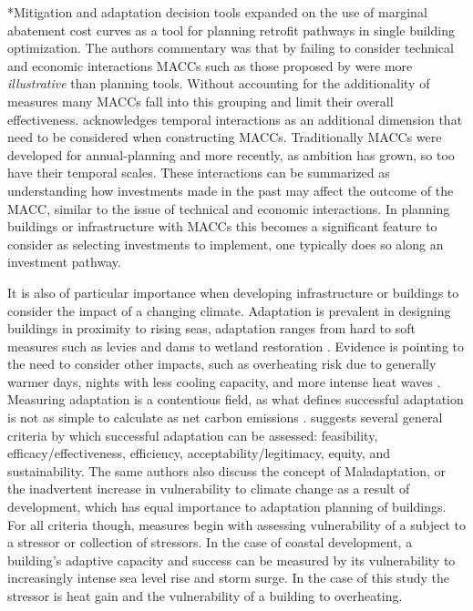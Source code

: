 \documentclass[twocolumn, a4paper,10pt]{article}
\makeatletter
\renewcommand\subsection{\@startsection{subsection}{1}{\z@}{\z@}{\z@}{\normalfont\normalsize\bfseries}}
\renewcommand\subsection{\@startsection{subsection}{1}{\z@}{\z@}{0.1pt}{\normalfont\normalsize\bfseries}}
\makeatother
\begin{document}
\subsection*{Mitigation and adaptation decision tools}
\citet{Rysanek MACC} expanded on the use of marginal abatement cost curves as a tool for planning retrofit pathways in single building optimization. The authors commentary was that by failing to consider technical and economic interactions MACCs such as those proposed by \citet{Mckinnsey} were more \textit{illustrative} than planning tools. Without accounting for the additionality of measures many MACCs fall into this grouping and limit their overall effectiveness. \citet{kesicki} acknowledges temporal interactions as an additional dimension that need to be considered when constructing MACCs. Traditionally MACCs were developed for annual-planning and more recently, as ambition has grown, so too have their temporal scales. These interactions can be summarized as understanding how investments made in the past may affect the outcome of the MACC, similar to the issue of technical and economic interactions. In planning buildings or infrastructure with MACCs this becomes a significant feature to consider as selecting investments to implement, one typically does so along an investment pathway. 

It is also of particular importance when developing infrastructure or buildings to consider the impact of a changing climate. Adaptation is prevalent in designing buildings in proximity to rising seas, adaptation ranges from hard to soft measures such as levies and dams to wetland restoration \citep{IPCC WGIIAR5 CH 15}. Evidence is pointing to the need to consider other impacts, such as overheating risk due to generally warmer days, nights with less cooling capacity, and more intense heat waves \citep{Lomas and Porrit; Rysanek ML Paper}. Measuring adaptation is a contentious field, as what defines successful adaptation is not as simple to calculate as net carbon emissions \citep{IPCC WGIIAR5 CH 14}. \citet{Brooks et al.} suggests several general criteria by which successful adaptation can be assessed: feasibility, efficacy/effectiveness, efficiency, acceptability/legitimacy, equity, and sustainability. The same authors also discuss the concept of Maladaptation, or the inadvertent increase in vulnerability to climate change as a result of development, which has equal importance to adaptation planning of buildings. For all criteria though, measures begin with assessing vulnerability of a subject to a stressor or collection of stressors. In the case of coastal development, a building's adaptive capacity and success can be measured by its vulnerability to increasingly intense sea level rise and storm surge. In the case of this study the stressor is heat gain and the vulnerability of a building to overheating. 
\end{document}
